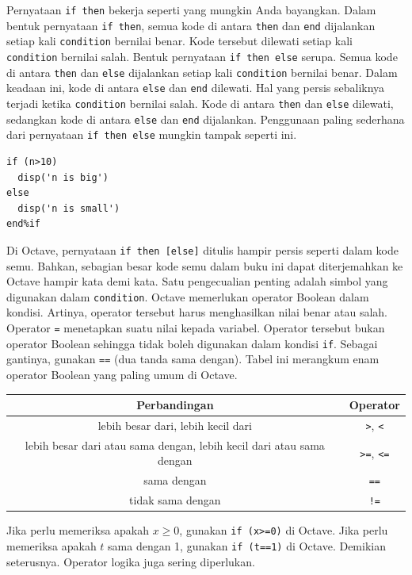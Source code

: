 Pernyataan \texttt{if then} bekerja seperti yang mungkin Anda bayangkan.
Dalam bentuk pernyataan \texttt{if then}, semua kode di antara \texttt{then}
dan \texttt{end} dijalankan setiap kali \texttt{condition} bernilai
benar. Kode tersebut dilewati setiap kali \texttt{condition} bernilai
salah. Bentuk pernyataan \texttt{if then else} serupa. Semua kode
di antara \texttt{then} dan \texttt{else} dijalankan setiap kali \texttt{condition}
bernilai benar. Dalam keadaan ini, kode di antara \texttt{else} dan
\texttt{end} dilewati. Hal yang persis sebaliknya terjadi ketika \texttt{condition}
bernilai salah. Kode di antara \texttt{then} dan \texttt{else} dilewati,
sedangkan kode di antara \texttt{else} dan \texttt{end} dijalankan.
Penggunaan paling sederhana dari pernyataan \texttt{if then else}
mungkin tampak seperti ini. \begin{verbatim}
if (n>10)
  disp('n is big')
else
  disp('n is small')
end%if
\end{verbatim}

\noindent Di Octave, pernyataan \texttt{if then {[}else{]}} ditulis
hampir persis seperti dalam kode semu. Bahkan, sebagian besar kode
semu dalam buku ini dapat diterjemahkan ke Octave hampir kata demi
kata. Satu pengecualian penting adalah simbol yang digunakan dalam
\texttt{condition}. Octave memerlukan operator Boolean dalam kondisi.
Artinya, operator tersebut harus menghasilkan nilai benar atau salah.
Operator \texttt{=} menetapkan suatu nilai kepada variabel. Operator
tersebut bukan operator Boolean sehingga tidak boleh digunakan dalam
kondisi \texttt{if}. Sebagai gantinya, gunakan \texttt{==} (dua tanda
sama dengan). Tabel ini merangkum enam operator Boolean yang paling
umum di Octave. 

\begin{center}
\begin{tabular}{c|c}
Perbandingan & Operator\tabularnewline
\hline 
lebih besar dari, lebih kecil dari & \texttt{>}, \texttt{<}\tabularnewline
lebih besar dari atau sama dengan, lebih kecil dari atau sama dengan & \texttt{>=}, \texttt{<=}\tabularnewline
sama dengan & \texttt{==}\tabularnewline
tidak sama dengan & \texttt{!=}\tabularnewline
\end{tabular}
\par\end{center}

\noindent Jika perlu memeriksa apakah $x\geq0$, gunakan \texttt{if
(x>=0)} di Octave. Jika perlu memeriksa apakah $t$ sama dengan 1,
gunakan \texttt{if (t==1)} di Octave. Demikian seterusnya. Operator
logika juga sering diperlukan. 

